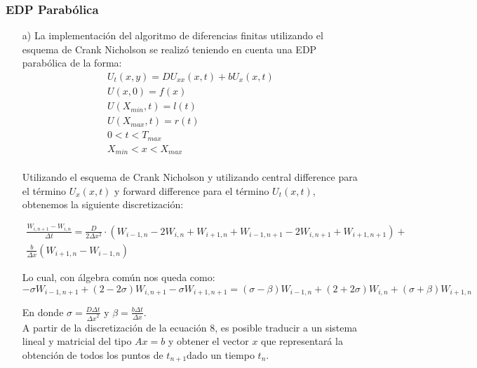 \documentclass[letterpaper]{article}
\newcommand{\5}
{
\\[.5cm]
}
\begin{document}
\subsubsection{EDP Parabólica}
\begin{itemize}
\item[a)] La implementación del algoritmo de diferencias finitas utilizando el esquema de Crank Nicholson se realizó teniendo en cuenta una EDP parabólica de la forma:
\begin{equation}
\begin{split}
 U_{t}(x, y) = D U_{xx}(x, t) + b U_x(x, t) \\
 U(x, 0) = f(x) \\
 U(X_{min}, t) = l(t) \\
 U(X_{max}, t) = r(t) \\
 0 < t < T_{max} \\
 X_{min} < x < X_{max} \\
 \end{split}
\end{equation}

Utilizando el esquema de Crank Nicholson y utilizando central difference para el término $U_x(x, t)$ y forward difference para el término $U_t(x, t)$, obtenemos la siguiente discretización:

\begin{equation}
\begin{split}
	\frac{W_{i, n+1} - W_{i, n}}{\Delta t} = \frac{D}{2\Delta x^2} \cdot (W_{i-1, n} - 2W_{i, n} + W_{i+1, n} + W_{i-1, n+1} - 2W_{i, n+1} + W_{i+1, n+1}) + \\ 
	\frac{b}{\Delta x}(W_{i+1, n} - W_{i-1, n})
\end{split}
\end{equation}


Lo cual, con álgebra común nos queda como:
\begin{equation}
	-\sigma W_{i-1, n+1} + (2 - 2 \sigma)W_{i, n+1} -\sigma W_{i+1, n+1} = (\sigma - \beta)W_{i-1, n} + (2 + 2\sigma)W_{i, n} + (\sigma + \beta)W_{i+1, n} 	
\end{equation}

En donde $\sigma = \frac{D \Delta t}{{\Delta x}^2}$ y $\beta = \frac{b \Delta t}{\Delta x}$. \\

A partir de la discretización de la ecuación 8, es posible traducir a un sistema lineal y matricial del tipo $Ax = b$ y obtener el vector $x$ que representará la obtención de todos los puntos de $t_{n+1}$dado un tiempo $t_{n}$. \\


\end{itemize}
\end{document}
